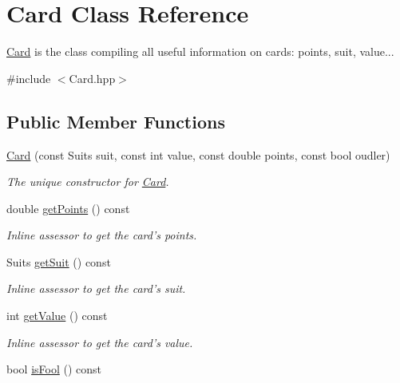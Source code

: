 \hypertarget{classCard}{\section{Card Class Reference}
\label{classCard}
}


\hyperlink{classCard}{Card} is the class compiling all useful information on cards\-: points, suit, value...  




{\ttfamily \#include $<$Card.\-hpp$>$}

\subsection*{Public Member Functions}
\begin{DoxyCompactItemize}
\item 
\hyperlink{classCard_a113a46b46e64efe0fd98a42df301db9a}{Card} (const Suits suit, const int value, const double points, const bool oudler)
\begin{DoxyCompactList}\small\item\em The unique constructor for \hyperlink{classCard}{Card}. \end{DoxyCompactList}\item 
\hypertarget{classCard_adf11e6396788e2e832d3bdf29880593f}{double \hyperlink{classCard_adf11e6396788e2e832d3bdf29880593f}{get\-Points} () const }\label{classCard_adf11e6396788e2e832d3bdf29880593f}

\begin{DoxyCompactList}\small\item\em Inline assessor to get the card's points. \end{DoxyCompactList}\item 
\hypertarget{classCard_a77f39ecaee335e62e267e44e07a15ebe}{Suits \hyperlink{classCard_a77f39ecaee335e62e267e44e07a15ebe}{get\-Suit} () const }\label{classCard_a77f39ecaee335e62e267e44e07a15ebe}

\begin{DoxyCompactList}\small\item\em Inline assessor to get the card's suit. \end{DoxyCompactList}\item 
\hypertarget{classCard_ab70c98dd7bfc44f87c5914990737e79d}{int \hyperlink{classCard_ab70c98dd7bfc44f87c5914990737e79d}{get\-Value} () const }\label{classCard_ab70c98dd7bfc44f87c5914990737e79d}

\begin{DoxyCompactList}\small\item\em Inline assessor to get the card's value. \end{DoxyCompactList}\item 
\hypertarget{classCard_aa05732992ee8352a205a15d89f4edda4}{bool \hyperlink{classCard_aa05732992ee8352a205a15d89f4edda4}{is\-Fool} () const }\label{classCard_aa05732992ee8352a205a15d89f4edda4}


\end{DoxyCompactItemize}
